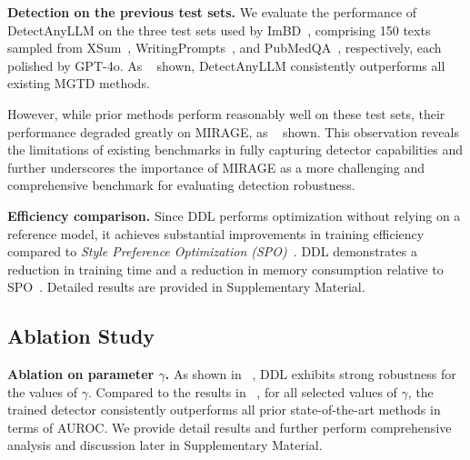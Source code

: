 \noindent \textbf{Detection on the previous test sets. }
We evaluate the performance of DetectAnyLLM on the three test sets used by ImBD~\cite{imbd}, comprising 150 texts sampled from XSum~\cite{xsum}, WritingPrompts~\cite{writting_prompts}, and PubMedQA~\cite{pubmedqa}, respectively, each polished by GPT-4o.
%
As ~ shown, DetectAnyLLM consistently outperforms all existing MGTD methods.

However, while prior methods perform reasonably well on these test sets, their performance degraded greatly on MIRAGE, as ~ shown.
%
This observation reveals the limitations of existing benchmarks in fully capturing detector capabilities and further underscores the importance of MIRAGE as a more challenging and comprehensive benchmark for evaluating detection robustness.

\noindent \textbf{Efficiency comparison. }
Since DDL performs optimization without relying on a reference model, it achieves substantial improvements in training efficiency compared to \textit{Style Preference Optimization (SPO)}~\cite{imbd}.
%
DDL demonstrates a  reduction in training time and a  reduction in memory consumption relative to SPO~\cite{imbd}.
%
Detailed results are provided in Supplementary Material.


\subsection{Ablation Study}\label{ablation_study}
\noindent \textbf{Ablation on parameter $\gamma$. }
As shown in ~, DDL exhibits strong robustness for the values of $\gamma$.
% 
Compared to the results in ~, for all selected values of $\gamma$, the trained detector consistently outperforms all prior state-of-the-art methods in terms of AUROC.
%
We provide detail results and further perform comprehensive analysis and discussion later in Supplementary Material.

